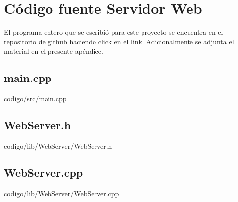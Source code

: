 \section{Código fuente Servidor Web}
El programa entero que se escribió para este proyecto se encuentra en el repositorio de github haciendo click en el \href{https://github.com/trorik23/tpii/}{link}. Adicionalmente se adjunta el material en el presente apéndice.

\subsection{main.cpp}


                     {codigo/src/main.cpp}
\newpage
                     
\subsection{WebServer.h}


                     {codigo/lib/WebServer/WebServer.h}
                     
\newpage
                     
\subsection{WebServer.cpp}


                     {codigo/lib/WebServer/WebServer.cpp}
                     
\newpage